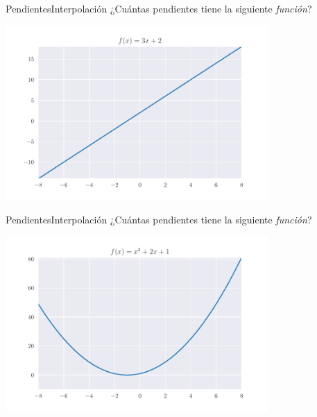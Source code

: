 \documentclass[spanish, c, dvipsnames]{beamer}
\begin{document}
\begin{frame}{Pendientes}{Interpolación}
    ¿Cuántas pendientes tiene la siguiente \textsl{función}?

    \bigskip

    \begin{center}
        \includegraphics[width=0.75\textwidth]{linear.pdf}
    \end{center}

\end{frame}

\begin{frame}{Pendientes}{Interpolación}
    ¿Cuántas pendientes tiene la siguiente \textsl{función}?

    \bigskip

    \begin{center}
        \includegraphics[width=0.75\textwidth]{quad.pdf}
    \end{center}

\end{frame}
\end{document}
